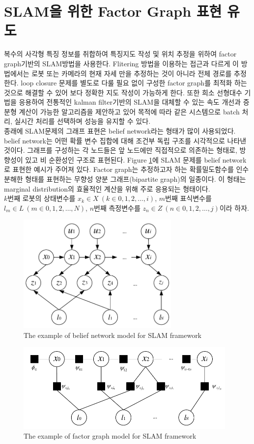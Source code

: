 \documentclass[master,korean,final]{cbnu-ecs}
\begin{document}
\section{SLAM을 위한 Factor Graph 표현 유도}
복수의 사각형 특징 정보를 취합하여 특징지도 작성 및 위치 추정을 위하여 factor graph기반의 SLAM방법을 사용한다. Flitering 방법을 이용하는 접근과 다르게 이 방법에서는 로봇 또는 카메라의 현재 자세 만을 추정하는 것이 아니라 전체 경로를 추정한다. loop closure 문제를 별도로 다룰 필요 없이 구성한 factor graph를 최적화 하는 것으로 해결할 수 있어 보다 정확한 지도 작성이 가능하게 한다. 또한 희소 선형대수 기법을 응용하여 전통적인 kalman filter기반의 SLAM을 대체할 수 있는 속도 개선과 증분형 계산이 가능한 알고리즘을 제안하고 있어 목적에 따라 같은 시스템으로 batch 처리, 실시간 처리를 선택하며 성능을 유지할 수 있다\cite{Dellaert2006, Kaess2007, Kaess2011}.\\
종래에 SLAM문제의 그래프 표현은 belief network라는 형태가 많이 사용되었다. belief network는 어떤 확률 변수 집합에 대해 조건부 독립 구조를 시각적으로 나타낸 것이다. 그래프를 구성하는 각 노드들은 앞 노드에만 직접적으로 의존하는 형태로, 방향성이 있고 비 순환성인 구조로 표현된다. Figure \ref{belief_network}에 SLAM 문제를 belief network로 표현한 예시가 주어져 있다. Factor graph는 추정하고자 하는 확률밀도함수를 인수분해한 형태를 표현하는 무향성 양분 그래프(bipartite graph)의 일종이다. 이 형태는 marginal distribution의 효율적인 계산을 위해 주로 응용되는 형태이다. \\
$k$번째 로봇의 상태변수를 $x_k\in X \ (k\in{0,1,2,\dots,i})$, $m$번째 표식변수를 $l_m\in L \ (m\in{0,1,2,\dots,N})$, $n$번째 측정변수를 $z_n\in Z \ (n\in{0,1,2,\dots,j})$이라 하자. 
\newpage
\begin{figure}[!ht]
  \centering
	\includegraphics[width=300px]{img/beliefnetwork_cropped.pdf}
  \caption{The example of belief network model for SLAM framework}
\label{belief_network}
\end{figure}

\begin{figure}[!ht]
  \centering
	\includegraphics[width=410px]{img/factorgraph_cropped.pdf}
  \caption{The example of factor graph model for SLAM framework}
\label{factorgraph_diagram}
\end{figure}
\newpage
\end{document}
